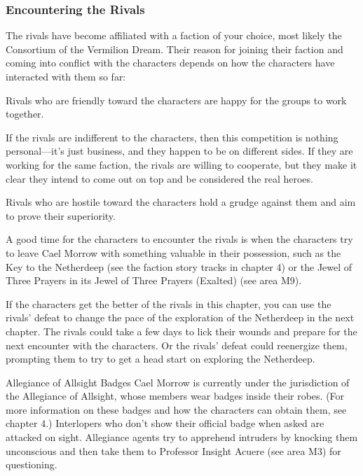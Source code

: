 \documentclass[10pt,a4paper,twoside,bg=print,twocolumn,openany,nodeprecatedcode]{dndbook}
\begin{document}
\subsubsection{Encountering the Rivals}
The rivals have become affiliated with a faction of your choice, most likely the Consortium of the Vermilion Dream. Their reason for joining their faction and coming into conflict with the characters depends on how the characters have interacted with them so far:


\begin{description}[nolistsep]
\item[Friendly Rivals.]
Rivals who are friendly toward the characters are happy for the groups to work together.
\item[Indifferent Rivals.]
If the rivals are indifferent to the characters, then this competition is nothing personal—it's just business, and they happen to be on different sides. If they are working for the same faction, the rivals are willing to cooperate, but they make it clear they intend to come out on top and be considered the real heroes.
\item[Hostile Rivals.]
Rivals who are hostile toward the characters hold a grudge against them and aim to prove their superiority.
\end{description}

A good time for the characters to encounter the rivals is when the characters try to leave Cael Morrow with something valuable in their possession, such as the Key to the Netherdeep (see the faction story tracks in chapter 4) or the Jewel of Three Prayers in its Jewel of Three Prayers (Exalted) (see area M9).

If the characters get the better of the rivals in this chapter, you can use the rivals' defeat to change the pace of the exploration of the Netherdeep in the next chapter. The rivals could take a few days to lick their wounds and prepare for the next encounter with the characters. Or the rivals' defeat could reenergize them, prompting them to try to get a head start on exploring the Netherdeep.

\begin{DndSidebar}[float=!b]{Allegiance of Allsight Badges}
Cael Morrow is currently under the jurisdiction of the Allegiance of Allsight, whose members wear badges inside their robes. (For more information on these badges and how the characters can obtain them, see chapter 4.) Interlopers who don't show their official badge when asked are attacked on sight. Allegiance agents try to apprehend intruders by knocking them unconscious and then take them to Professor Insight Acuere (see area M3) for questioning.
\end{DndSidebar}
\end{document}
